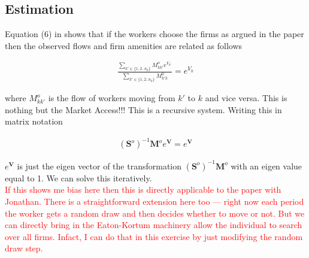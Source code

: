 \documentclass{report}
\numberwithin{equation}{section}
\numberwithin{figure}{section}
\numberwithin{table}{section}
\begin{document}
\subsection{Estimation}

Equation (6) in \cite{sorkin2018ranking} shows that if the workers choose the firms as argued in the paper then the observed flows and firm amenities are related as follows

\begin{align}
  \frac{\sum_{k' \in \{1,2..n_k\}} M^o_{kk'} e^{V_{k'}}}{\sum_{k' \in \{1,2..n_k\}} M^0_{k'k}} = e^{V_k}
\end{align}

where $M^o_{kk'}$ is the flow of workers moving from $k'$ to $k$ and vice versa. This is nothing but the Market Access!!! This is a recursive system. Writing this in matrix notation

\begin{align}
(\mathbf S^o)^{-1} \mathbf M^o e^{\mathbf V} = e^{\mathbf V}
\end{align}

$e^{\mathbf V}$ is just the eigen vector of the transformation $(\mathbf S^o)^{-1} \mathbf M^o$ with an eigen value equal to 1. We can solve this iteratively.\\


\textcolor{red}{If this shows me bias here then this is directly applicable to the paper with Jonathan. There is a straightforward extension here too — right now each period the worker gets a random draw and then decides whether to move or not. But we can directly bring in the Eaton-Kortum machinery allow the individual to search over all firms. Infact, I can do that in this exercise by just modifying the random draw step. }


\end{document}
